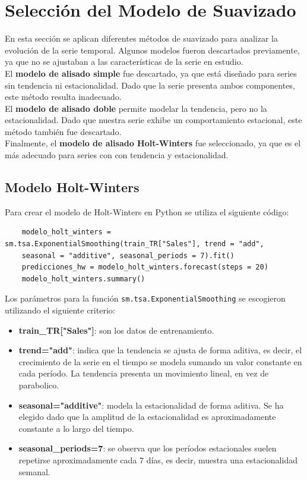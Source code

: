 \section{Selección del Modelo de Suavizado}
En esta sección se aplican diferentes métodos de suavizado para analizar la evolución de la serie temporal. Algunos modelos fueron descartados previamente, ya que no se ajustaban a las características de la serie en estudio.\\

El \textbf{modelo de alisado simple} fue descartado, ya que está diseñado para series sin tendencia ni estacionalidad. Dado que la serie presenta ambos componentes, este método resulta inadecuado.\\

El \textbf{modelo de alisado doble} permite modelar la tendencia, pero no la estacionalidad. Dado que nuestra serie exhibe un comportamiento estacional, este método también fue descartado.\\

Finalmente, el \textbf{modelo de alisado Holt-Winters} fue seleccionado, ya que es el más adecuado para series con con tendencia y estacionalidad.

\subsection{Modelo Holt-Winters}
Para crear el modelo de Holt-Winters en Python se utiliza el siguiente código:
\begin{lstlisting}
	modelo_holt_winters = sm.tsa.ExponentialSmoothing(train_TR["Sales"], trend = "add",
	seasonal = "additive", seasonal_periods = 7).fit()
	predicciones_hw = modelo_holt_winters.forecast(steps = 20)
	modelo_holt_winters.summary()
\end{lstlisting}

Los parámetros para la función \lstinline|sm.tsa.ExponentialSmoothing| se escogieron utilizando el siguiente criterio:
\begin{itemize}
	\item \textbf{train\_TR["Sales"]}: son los datos de entrenamiento.
	\item \textbf{trend="add"}: indica que la tendencia se ajusta de forma aditiva, es decir, el crecimiento de la serie en el tiempo se modela sumando un valor constante en cada período. La tendencia presenta un movimiento lineal, en vez de parabolico.
	\item \textbf{seasonal="additive"}: modela la estacionalidad de forma aditiva. Se ha elegido dado que la amplitud de la estacionalidad es aproximadamente constante a lo largo del tiempo.
	\item \textbf{seasonal\_periods=7}: se observa que los períodos estacionales suelen repetirse aproximadamente cada 7 días, es decir, muestra una estacionalidad semanal. 
\end{itemize}

